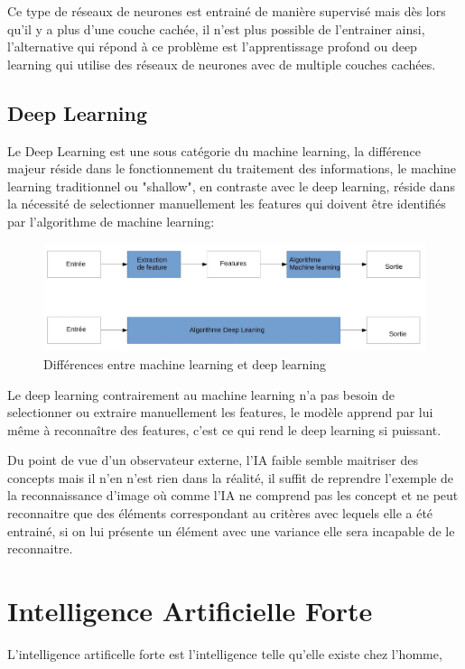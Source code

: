 Ce type de réseaux de neurones est entrainé de manière supervisé mais dès lors qu'il 
y a plus d'une couche cachée, il n'est plus possible de l'entrainer ainsi,
l'alternative qui répond à ce problème est l'apprentissage profond ou 
deep learning qui utilise des réseaux de neurones avec de multiple couches 
cachées.  


\subsection{Deep Learning}
Le Deep Learning est une sous catégorie du machine learning, 
la différence majeur réside dans le fonctionnement du traitement des 
informations, le machine learning traditionnel ou "shallow", en contraste avec le deep 
learning, réside dans la nécessité de selectionner manuellement les features 
qui doivent être identifiés par l'algorithme de machine learning:

\begin{figure}[!h]
    \centering
    \includegraphics[width=1\textwidth]{Images/MLvsDL}
    \caption{Différences entre machine learning et deep learning}
	\label{fig:DiffMLDL}
\end{figure}

Le deep learning contrairement au machine learning n'a pas besoin de selectionner 
ou extraire manuellement les features, le modèle apprend par lui même à reconnaître 
des features, c'est ce qui rend le deep learning si puissant.

\newpage
Du point de vue d'un observateur externe, l'IA faible
semble maitriser des concepts mais il n'en n'est rien dans la 
réalité, il suffit de reprendre l'exemple de la reconnaissance d'image
où comme l'IA ne comprend pas les concept et ne peut reconnaitre 
que des éléments correspondant au critères avec lequels elle a été 
entrainé, si on lui présente un élément avec une variance elle 
sera incapable de le reconnaitre.

\section{Intelligence Artificielle Forte}
L'intelligence artificelle forte est l'intelligence
telle qu'elle existe chez l'homme, 